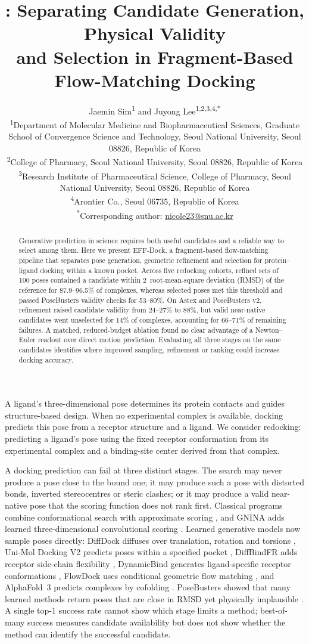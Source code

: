 \documentclass{article}
\title{\method: Separating Candidate Generation, Physical Validity\\
and Selection in Fragment-Based Flow-Matching Docking}
\author{\parbox{0.96\textwidth}{\centering
Jaemin Sim\textsuperscript{1} and Juyong Lee\textsuperscript{1,2,3,4,*}\\[0.75em]
\small\textsuperscript{1}Department of Molecular Medicine and Biopharmaceutical Sciences, Graduate School of Convergence Science and Technology, Seoul National University, Seoul 08826, Republic of Korea\\
\small\textsuperscript{2}College of Pharmacy, Seoul National University, Seoul 08826, Republic of Korea\\
\small\textsuperscript{3}Research Institute of Pharmaceutical Science, College of Pharmacy, Seoul National University, Seoul 08826, Republic of Korea\\
\small\textsuperscript{4}Arontier Co., Seoul 06735, Republic of Korea\\[0.5em]
\small\textsuperscript{*}Corresponding author: \href{mailto:nicole23@snu.ac.kr}{nicole23@snu.ac.kr}
}}
\date{}
\newcommand{\method}{EFF-Dock\xspace}
\newcommand{\angstrom}{\text{\normalfont\AA}}
\newcommand{\citep}[1]{\cite{#1}}
\begin{document}
\maketitle

\begin{abstract}
Generative prediction in science requires both useful candidates and a reliable way to select among them. Here we present \method, a fragment-based flow-matching pipeline that separates pose generation, geometric refinement and selection for protein--ligand docking within a known pocket. Across five redocking cohorts, refined sets of 100 poses contained a candidate within 2\,\angstrom{} root-mean-square deviation (RMSD) of the reference for 87.9--96.5\% of complexes, whereas selected poses met this threshold and passed PoseBusters validity checks for 53--80\%. On Astex and PoseBusters v2, refinement raised candidate validity from 24--27\% to 88\%, but valid near-native candidates went unselected for 14\% of complexes, accounting for 66--71\% of remaining failures. A matched, reduced-budget ablation found no clear advantage of a Newton--Euler readout over direct motion prediction. Evaluating all three stages on the same candidates identifies where improved sampling, refinement or ranking could increase docking accuracy.
\end{abstract}

\label{sec:introduction}

A ligand's three-dimensional pose determines its protein contacts and guides structure-based design. When no experimental complex is available, docking predicts this pose from a receptor structure and a ligand. We consider redocking: predicting a ligand's pose using the fixed receptor conformation from its experimental complex and a binding-site center derived from that complex.

A docking prediction can fail at three distinct stages. The search may never produce a pose close to the bound one; it may produce such a pose with distorted bonds, inverted stereocentres or steric clashes; or it may produce a valid near-native pose that the scoring function does not rank first. Classical programs combine conformational search with approximate scoring \citep{trott2010vina,eberhardt2021vina}, and GNINA adds learned three-dimensional convolutional scoring \citep{mcnutt2025gnina}. Learned generative models now sample poses directly: DiffDock diffuses over translation, rotation and torsions \citep{corso2023diffdock}, Uni-Mol Docking V2 predicts poses within a specified pocket \citep{alcaide2024unimoldocking}, DiffBindFR adds receptor side-chain flexibility \citep{zhu2024diffbindfr}, DynamicBind generates ligand-specific receptor conformations \citep{lu2024dynamicbind}, FlowDock uses conditional geometric flow matching \citep{morehead2025flowdock}, and AlphaFold~3 predicts complexes by cofolding \citep{abramson2024alphafold3}. PoseBusters showed that many learned methods return poses that are close in RMSD yet physically implausible \citep{buttenschoen2024posebusters}. A single top-1 success rate cannot show which stage limits a method; best-of-many success measures candidate availability but does not show whether the method can identify the successful candidate.
\end{document}
